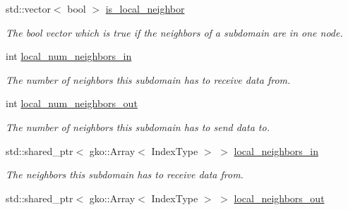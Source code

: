 \begin{DoxyCompactItemize}
std\+::vector$<$ bool $>$ \hyperlink{structschwz_1_1Communicate_1_1comm__struct_ae36319cfa4fc09154135a2b121377d3b}{is\+\_\+local\+\_\+neighbor}
\begin{DoxyCompactList}\small\item\em The bool vector which is true if the neighbors of a subdomain are in one node. \end{DoxyCompactList}\item 
\mbox{\label{structschwz_1_1Communicate_1_1comm__struct_a9d4febd22c050bd5bbeb0f122d74fdd0}} 
int \hyperlink{structschwz_1_1Communicate_1_1comm__struct_a9d4febd22c050bd5bbeb0f122d74fdd0}{local\+\_\+num\+\_\+neighbors\+\_\+in}
\begin{DoxyCompactList}\small\item\em The number of neighbors this subdomain has to receive data from. \end{DoxyCompactList}\item 
\mbox{\label{structschwz_1_1Communicate_1_1comm__struct_a8b211e456ef9f0947df8fad0e0428990}} 
int \hyperlink{structschwz_1_1Communicate_1_1comm__struct_a8b211e456ef9f0947df8fad0e0428990}{local\+\_\+num\+\_\+neighbors\+\_\+out}
\begin{DoxyCompactList}\small\item\em The number of neighbors this subdomain has to send data to. \end{DoxyCompactList}\item 
\mbox{\label{structschwz_1_1Communicate_1_1comm__struct_a4e43434348a60554ecfdbd448fa54f73}} 
std\+::shared\+\_\+ptr$<$ gko\+::\+Array$<$ Index\+Type $>$ $>$ \hyperlink{structschwz_1_1Communicate_1_1comm__struct_a4e43434348a60554ecfdbd448fa54f73}{local\+\_\+neighbors\+\_\+in}
\begin{DoxyCompactList}\small\item\em The neighbors this subdomain has to receive data from. \end{DoxyCompactList}\item 
\mbox{\label{structschwz_1_1Communicate_1_1comm__struct_a087b62605d0889090c6e67325dfa3fb0}} 
std\+::shared\+\_\+ptr$<$ gko\+::\+Array$<$ Index\+Type $>$ $>$ \hyperlink{structschwz_1_1Communicate_1_1comm__struct_a087b62605d0889090c6e67325dfa3fb0}{local\+\_\+neighbors\+\_\+out}

\end{DoxyCompactItemize}
